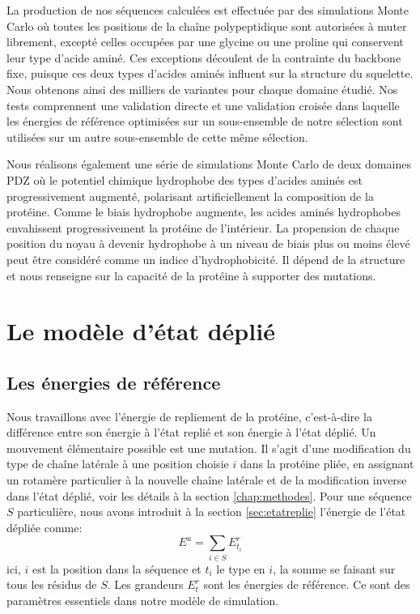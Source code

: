 La production de nos séquences calculées est effectuée par des simulations Monte Carlo où toutes les positions de la chaîne polypeptidique sont autorisées à muter librement, excepté celles occupées par une glycine ou une proline qui conservent leur type d'acide aminé. Ces exceptions découlent de la contrainte du backbone fixe, puisque ces deux types d'acides aminés influent sur la structure du squelette. Nous obtenons ainsi des milliers de variantes pour chaque domaine étudié. Nos tests comprennent une validation directe et une validation croisée dans laquelle les énergies de référence optimisées sur un sous-ensemble de notre sélection sont utilisées sur un autre sous-ensemble de cette même sélection.

Nous réalisons également une série de simulations Monte Carlo de deux domaines PDZ où le potentiel chimique hydrophobe des types d'acides aminés est progressivement augmenté, polarisant artificiellement la composition de la protéine. Comme le biais hydrophobe augmente, les acides aminés hydrophobes envahissent progressivement la protéine de l'intérieur. La propension de chaque position du noyau à devenir hydrophobe à un niveau de biais plus ou moins élevé peut être considéré comme un indice d'hydrophobicité. Il dépend de la structure et nous renseigne sur la capacité de la protéine à supporter des mutations.

\section{Le modèle d'état déplié}
\subsection{Les énergies de référence}
\label{sec:enerref}
Nous travaillons avec l'énergie de repliement de la protéine, c'est-à-dire la différence entre
son énergie à l'état replié et son énergie à l'état déplié. Un mouvement élémentaire possible est une \og mutation\fg. Il s'agit d'une modification du type de chaîne latérale à une position choisie $i$ dans la protéine pliée, en assignant un rotamère particulier à la nouvelle chaîne latérale et de la modification inverse dans l'état déplié, voir les détails à la section \ref{chap:methodes}. Pour une séquence $S$ particulière, nous avons introduit à la section \ref{sec:etatreplie} l'énergie de l'état dépliée comme:
\begin{equation}
  E^u=\sum_{i\in S}E^r_{t_i}
  \label{eq:unfolded}
\end{equation} 
ici, $i$ est la position dans la séquence et $t_i$ le type en $i$, la somme se faisant sur tous les résidus de $S$. Les grandeurs $E_t^r$ sont les  \og énergies de référence\fg. Ce sont des paramètres essentiels dans notre modèle de simulation. 

